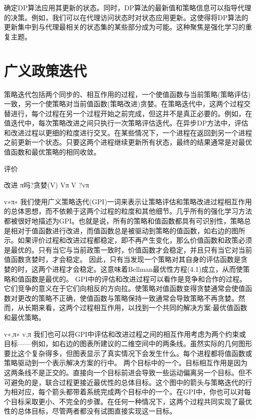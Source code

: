 确定DP算法应用其更新的状态。同时，DP算法的最新值和策略信息可以指导代理的决策。例如，我们可以在代理访问状态时对状态应用更新。这使得将DP算法的更新集中到与代理最相关的状态集的某些部分成为可能。这种聚焦是强化学习的重复主题。


\section{广义政策迭代}

策略迭代包括两个同步的、相互作用的过程，一个使值函数与当前策略(策略评估)一致，另一个使策略对当前值函数(策略改进)贪婪。在策略迭代中，这两个过程交替进行，每个过程在另一个过程开始之前完成，但这并不是真正必要的。例如，在值迭代中，每次策略改进之间只执行一次策略评估迭代。在异步DP方法中，评估和改进过程以更细的粒度进行交叉。在某些情况下，一个进程在返回到另一个进程之前更新一个状态。只要这两个进程继续更新所有状态，最终的结果通常是对最优值函数和最优策略的相同收敛。


评价




改进
π吗?贪婪(V)
Vπ
V ?vπ




v∗π∗
我们使用广义策略迭代(GPI)一词来表示让策略评估和策略改进过程相互作用的总体思想，而不依赖于这两个过程的粒度和其他细节。几乎所有的强化学习方法都被很好地描述为GPI。也就是说，所有的策略和值函数都具有可识别性，策略总是相对于值函数进行改进，而值函数总是被驱动到策略的值函数，如右边的图所示。如果评价过程和改进过程都稳定，即不再产生变化，那么价值函数和政策必须是最优的。只有当它与当前政策一致时，价值函数才会稳定，并且只有当它对当前值函数贪婪时，才会稳定。
因此，只有当发现一个策略对其自身的评估函数是贪婪的时，这两个进程才会稳定。这意味着Bellman最优性方程(4.1)成立，从而使策略和值函数是最优的。
GPI中的评估和改进过程可以看作是竞争和合作的过程。它们竞争的意义在于它们向相反的方向拉。使策略对值函数变得贪婪通常会使值函数对更改的策略不正确，使值函数与策略保持一致通常会导致策略不再贪婪。然而，从长期来看，这两个过程相互作用，以找到一个共同的解决方案:最优值函数和最优策略。



v∗,π∗
v,π
我们也可以将GPI中评估和改进过程之间的相互作用考虑为两个约束或目标——例如，如右边的图表所建议的二维空间中的两条线。虽然实际的几何图形要比这个复杂得多，但图表显示了真实情况下会发生什么。每个进程都将值函数或策略驱动到一个表示解决方案的行中。
两个目标中的一个。目标相互作用是因为这两条线不是正交的。直接向一个目标前进会导致一些运动偏离另一个目标。但不可避免的是，联合过程更接近最优性的总体目标。这个图中的箭头与策略迭代的行为相对应，每个箭头都带着系统完成两个目标中的一个。在GPI中，你也可以对每个目标采取更小、不完全的步骤。在任何一种情况下，这两个过程共同实现了最优性的总体目标，尽管两者都没有试图直接实现这一目标。

